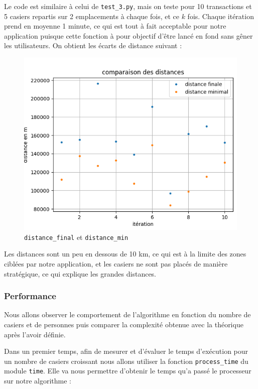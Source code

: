 \documentclass[11pt]{article}
\begin{document}
Le code est similaire à celui de \texttt{test\_3.py}, mais on teste pour 10 transactions et 5 casiers repartis sur 2 emplacements à chaque fois, et ce $k$ fois. Chaque itération prend en moyenne 1 minute, ce qui est tout à fait acceptable pour notre application puisque cette fonction à pour objectif d'être lancé en fond sans gêner les utilisateurs. On obtient les écarts de distance suivant :


\begin{figure}[h]
     \centering
     \includegraphics[scale=0.6]{test4_graph.png}
     \caption{\texttt{distance\_final} et \texttt{distance\_min} }
\end{figure}

Les distances sont un peu en dessous de 10 km, ce qui est à la limite des zones ciblées par notre application, et les casiers ne sont pas placés de manière stratégique, ce qui explique les grandes distances.
\vspace{0.4cm}


\subsubsection{Performance}
Nous allons observer le comportement de l’algorithme en fonction du nombre de casiers et de personnes puis comparer la complexité obtenue avec la théorique après l'avoir définie.
\vspace{0.4cm}

Dans un premier temps, afin de mesurer et d'évaluer le temps d'exécution pour un nombre de casiers croissant nous allons utiliser la fonction \texttt{process\_time} du module \texttt{time}. Elle va nous permettre d'obtenir le temps qu'a passé le processeur sur notre algorithme :
\vspace{0.4cm}
\end{document}
